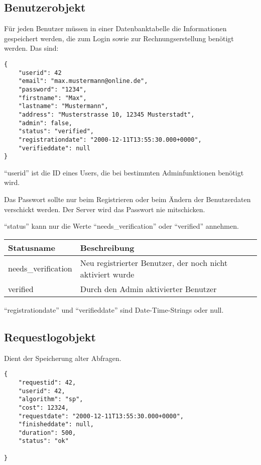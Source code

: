 \documentclass[ngerman,titlepage,parskip=true]{scrartcl}
\begin{document}
	\subsection{Benutzerobjekt}
	\label{benutzerobjekt}
	Für jeden Benutzer müssen in einer Datenbanktabelle die Informationen gespeichert werden, die zum Login sowie zur Rechnungserstellung benötigt werden. 	
	Das sind:
	
\begin{lstlisting}
{
	"userid": 42
	"email": "max.mustermann@online.de",
	"password": "1234",
	"firstname": "Max",
	"lastname": "Mustermann",
	"address": "Musterstrasse 10, 12345 Musterstadt",
	"admin": false,
	"status": "verified",
	"registrationdate": "2000-12-11T13:55:30.000+0000",
	"verifieddate": null
}
\end{lstlisting}
	
	``userid'' ist die ID eines Users, die bei bestimmten Adminfunktionen benötigt wird.
	
	Das Passwort sollte nur beim Registrieren oder beim Ändern der Benutzerdaten verschickt werden. Der Server wird das Passwort nie mitschicken.
	
	``status'' kann nur die Werte ``needs{\_}verification'' oder ``verified'' annehmen. 
	
	\begin{tabular}{|p{}|p{}|}
	\hline
	Statusname 	& Beschreibung \\\hline
	needs{\_}verification 	& Neu registrierter Benutzer, der noch nicht aktiviert wurde\\
	verified 				& Durch den Admin aktivierter Benutzer \\
	\hline
	\end{tabular}	
	
	
	``registrationdate'' und ``verifieddate'' sind Date-Time-Strings oder null. 
	
	\subsection{Requestlogobjekt}	
	Dient der Speicherung alter Abfragen.
	\label{requestlogobjekt}

\begin{lstlisting}
{
	"requestid": 42,
	"userid": 42,
	"algorithm": "sp",
	"cost": 12324,
	"requestdate": "2000-12-11T13:55:30.000+0000",
	"finisheddate": null,
	"duration": 500,
	"status": "ok"
	
}
\end{lstlisting}
\end{document}
